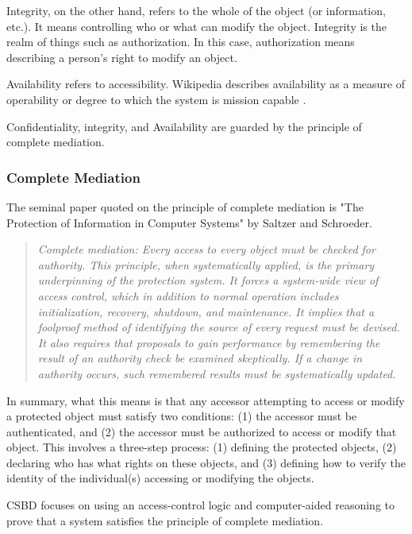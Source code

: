 \documentclass[../../main/main.tex]{subfiles}
\begin{document}
Integrity, on the other hand, refers to the whole of the object (or information, etc.).  It means controlling who or what can modify the object.   Integrity is the realm of things such as authorization.  In this case, authorization means describing a person's right to modify an object.  

Availability refers to accessibility.  Wikipedia describes availability as a measure of operability or degree to which the system is mission capable \cite {availability}. 

Confidentiality, integrity, and Availability are guarded by the principle of complete mediation.  


\subsubsection{Complete Mediation}\label{sssec:strommediate}
The seminal paper quoted on the principle of complete mediation is "The Protection of Information in Computer Systems" by Saltzer and Schroeder.  
\begin{quote}
\textit{
Complete mediation: Every access to every object must be checked for authority. This principle, when systematically applied, is the primary underpinning of the protection system. It forces a system-wide view of access control, which in addition to normal operation includes initialization, recovery, shutdown, and maintenance. It implies that a foolproof method of identifying the source of every request must be devised. It also requires that proposals to gain performance by remembering the result of an authority check be examined skeptically. If a change in authority occurs, such remembered results must be systematically updated.} \cite{saltzer}
\end{quote}

In summary, what this means is that any accessor attempting to access or modify a protected object must satisfy two conditions: (1) the accessor must be authenticated, and (2) the accessor must be authorized to access or modify that object.  This involves a three-step process: (1) defining the protected objects, (2) declaring who has what rights on these objects, and (3) defining how to verify the identity of the individual(s) accessing or modifying the objects.  

CSBD focuses on using an access-control logic and computer-aided reasoning to prove that a system satisfies the principle of complete mediation.
\end{document}
